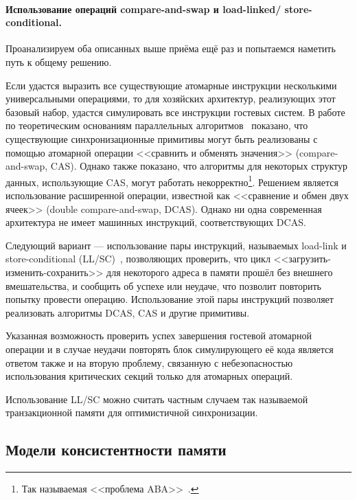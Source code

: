 \paragraph{Использование операций compare-and-swap и load-linked/ store-conditional.}  Проанализируем оба описанных выше приёма ещё раз и попытаемся наметить путь к общему решению.

Если удастся выразить все существующие атомарные инструкции несколькими универсальными операциями, то для хозяйских архитектур, реализующих этот базовый набор, удастся симулировать все инструкции гостевых систем. В работе по теоретическим основаниям параллельных алгоритмов~\cite{Herlihy:1991:WS:114005.102808} показано, что существующие синхронизационные примитивы могут быть реализованы с помощью атомарной операции <<сравнить и обменять значения>> (\abbr compare-and-swap, CAS). Однако также показано, что алгоритмы для некоторых структур данных, использующие CAS, могут работать некорректно\footnote{Так называемая <<проблема ABA>>~\cite{aba-problem}.}. Решением является использование расширенной операции, известной как <<сравнение и обмен двух ячеек>> (\abbr double compare-and-swap, DCAS). Однако ни одна современная архитектура не имеет машинных инструкций, соответствующих DCAS.

Следующий вариант --- использование пары инструкций, называемых load-link и store-conditional (LL/SC)~\cite{jensen:load-linked}, позволяющих проверить, что цикл <<загрузить-изменить-сохранить>> для некоторого адреса в памяти прошёл без внешнего вмешательства, и сообщить об успехе или неудаче, что позволит повторить попытку провести операцию. Использование этой пары инструкций позволяет реализовать алгоритмы DCAS, CAS и другие примитивы.

Указанная возможность проверить успех завершения гостевой атомарной операции и в случае неудачи повторять блок симулирующего её кода является ответом также и на вторую проблему, связанную с небезопасностью использования критических секций только для атомарных операций.

Использование LL/SC можно считать частным случаем так называемой транзакционной памяти для оптимистичной синхронизации. %

\subsection{Модели консистентности памяти}


